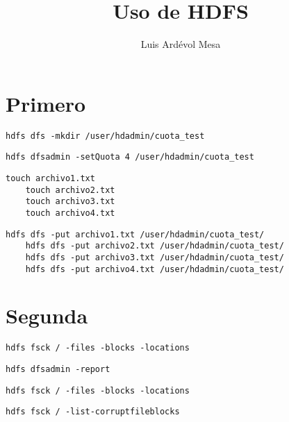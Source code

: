 \documentclass[10pt]{opticajnl}
\title{Uso de HDFS}
\author[1,2,3]{Luis Ardévol Mesa}
\begin{document}
\maketitle

\section{Primero}

\begin{lstlisting}[style=terminal]
    hdfs dfs -mkdir /user/hdadmin/cuota_test
\end{lstlisting}

\begin{lstlisting}[style=terminal]
    hdfs dfsadmin -setQuota 4 /user/hdadmin/cuota_test
\end{lstlisting}

\begin{lstlisting}[style=terminal]
    touch archivo1.txt
    touch archivo2.txt
    touch archivo3.txt
    touch archivo4.txt
\end{lstlisting}

\begin{lstlisting}[style=terminal]
    hdfs dfs -put archivo1.txt /user/hdadmin/cuota_test/
    hdfs dfs -put archivo2.txt /user/hdadmin/cuota_test/
    hdfs dfs -put archivo3.txt /user/hdadmin/cuota_test/
    hdfs dfs -put archivo4.txt /user/hdadmin/cuota_test/
\end{lstlisting}


\section{Segunda}

\begin{lstlisting}[style=terminal]
    hdfs fsck / -files -blocks -locations
\end{lstlisting}

\begin{lstlisting}[style=terminal]
    hdfs dfsadmin -report
\end{lstlisting}

\begin{lstlisting}[style=terminal]
    hdfs fsck / -files -blocks -locations
\end{lstlisting}

\begin{lstlisting}[style=terminal]
    hdfs fsck / -list-corruptfileblocks
\end{lstlisting}
\end{document}
